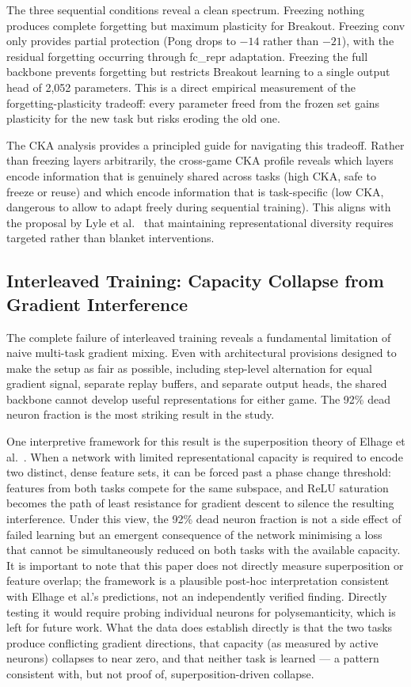\documentclass[a4paper]{article}
\begin{document}
The three sequential conditions reveal a clean spectrum. Freezing nothing produces complete
forgetting but maximum plasticity for Breakout. Freezing conv only provides partial
protection (Pong drops to $-14$ rather than $-21$), with the residual forgetting occurring
through fc\_repr adaptation. Freezing the full backbone prevents forgetting but restricts
Breakout learning to a single output head of 2,052 parameters. This is a direct empirical
measurement of the forgetting-plasticity tradeoff: every parameter freed from the frozen set
gains plasticity for the new task but risks eroding the old one.

The CKA analysis provides a principled guide for navigating this tradeoff. Rather than
freezing layers arbitrarily, the cross-game CKA profile reveals which layers encode
information that is genuinely shared across tasks (high CKA, safe to freeze or reuse) and
which encode information that is task-specific (low CKA, dangerous to allow to adapt freely
during sequential training). This aligns with the proposal by Lyle et al.\ \cite{lyle2022understanding}
that maintaining representational diversity requires targeted rather than blanket
interventions.

\subsection{Interleaved Training: Capacity Collapse from Gradient Interference}

The complete failure of interleaved training reveals a fundamental limitation of naive
multi-task gradient mixing. Even with architectural provisions designed to make the setup
as fair as possible, including step-level alternation for equal gradient signal, separate
replay buffers, and separate output heads, the shared backbone cannot develop useful
representations for either game. The 92\% dead neuron fraction is the most striking result
in the study.

One interpretive framework for this result is the superposition theory of Elhage et al.\
\cite{elhage2022superposition}. When a network with limited representational capacity is
required to encode two distinct, dense feature sets, it can be forced past a phase change
threshold: features from both tasks compete for the same subspace, and ReLU saturation
becomes the path of least resistance for gradient descent to silence the resulting
interference. Under this view, the 92\% dead neuron fraction is not a side effect of failed
learning but an emergent consequence of the network minimising a loss that cannot be
simultaneously reduced on both tasks with the available capacity. It is important to note
that this paper does not directly measure superposition or feature overlap; the framework is
a plausible post-hoc interpretation consistent with Elhage et al.'s predictions, not an
independently verified finding. Directly testing it would require probing individual neurons
for polysemanticity, which is left for future work. What the data does establish directly is
that the two tasks produce conflicting gradient directions, that capacity (as measured by
active neurons) collapses to near zero, and that neither task is learned — a pattern
consistent with, but not proof of, superposition-driven collapse.
\end{document}
